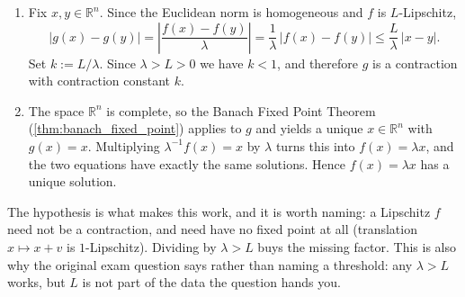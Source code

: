 \begin{exercisesolution}
\label{sol:banach_fixed_point_linear}
\begin{enumerate}[label=\textbf{(\alph*)}]
  \item Fix $x,y \in \mathbb{R}^n$. Since the Euclidean norm is homogeneous and $f$ is
    $L$-Lipschitz,
\[
\lvert g(x) - g(y)\rvert = \left\lvert \frac{f(x) - f(y)}{\lambda} \right\rvert
  = \frac{1}{\lambda}\,\lvert f(x) - f(y)\rvert \leq \frac{L}{\lambda}\,\lvert x - y\rvert .
\]
Set $k := L/\lambda$. Since $\lambda > L > 0$ we have $k < 1$, and therefore $g$ is a contraction
with contraction constant $k$.

  \item The space $\mathbb{R}^n$ is complete, so the Banach Fixed Point Theorem
    (\cref{thm:banach_fixed_point}) applies to $g$ and yields a unique $x \in \mathbb{R}^n$ with
    $g(x) = x$. Multiplying $\lambda^{-1} f(x) = x$ by $\lambda$ turns this into $f(x) = \lambda x$,
    and the two equations have exactly the same solutions. Hence $f(x) = \lambda x$ has a unique
    solution.
\end{enumerate}
\begin{ainote}
The hypothesis is what makes this work, and it is worth naming: a Lipschitz $f$ need not be a
contraction, and need have no fixed point at all (translation $x \mapsto x + v$ is $1$-Lipschitz).
Dividing by $\lambda > L$ buys the missing factor. This is also why the original exam question says
 rather than naming a threshold: any $\lambda > L$ works,
but $L$ is not part of the data the question hands you.
\end{ainote}
\end{exercisesolution}

